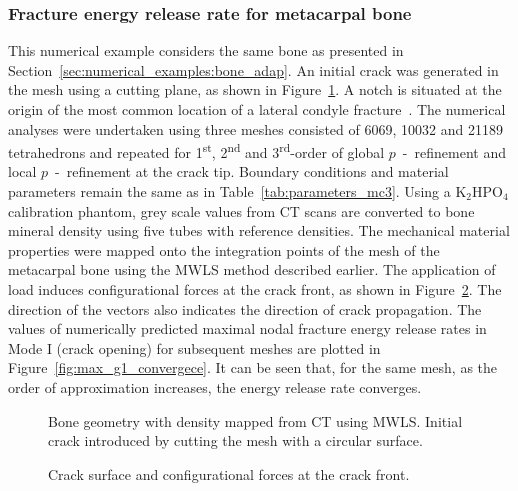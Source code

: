 \documentclass[twocolumn]{svjour3}
\begin{document}
\subsubsection{Fracture energy release rate for metacarpal bone} 
\label{sec:mc3_release_eng}
This numerical example considers the same bone as presented in Section~\ref{sec:numerical_examples:bone_adap}. 
An initial crack was generated in the mesh using a cutting plane, as shown in Figure~\ref{fig:bone_ct_mesh_cut}. A notch is situated at the origin of the most common location of a lateral condyle fracture~\cite{jacklin2012frequency}. 
The numerical analyses were undertaken using three meshes consisted of 6069, 10032 and 21189 tetrahedrons and repeated for 1\textsuperscript{st}, 2\textsuperscript{nd} and 3\textsuperscript{rd}-order of global $p$~-~refinement and local $p$~-~refinement at the crack tip. 
Boundary conditions and material parameters remain the same as in Table~\ref{tab:parameters_mc3}. 
Using a $\mathrm {K_2 HPO_4}$ calibration phantom, grey scale values from CT scans are converted to bone mineral density using five tubes with reference densities. 
The mechanical material properties were mapped onto the integration points of the mesh of the metacarpal bone using the MWLS method described earlier. 
The application of load induces configurational forces at the crack front, as shown in Figure~\ref{fig:crackfrontforce}. 
The direction of the vectors also indicates the direction of crack propagation.
The values of numerically predicted maximal nodal fracture energy release rates in Mode I (crack opening) for subsequent meshes are plotted in Figure~\ref{fig:max_g1_convergece}. 
It can be seen that, for the same mesh, as the order of approximation increases, the energy release rate converges. 
\begin{figure}[h]
	\centering
		\def\svgwidth{7cm}
		
	\caption{Bone geometry with density mapped from CT using MWLS. Initial crack introduced by cutting the mesh with a circular surface.}
	\label{fig:bone_ct_mesh_cut}
\end{figure}

\begin{figure}[h!]
	\centering
	\def\svgwidth{7cm}
	
	\caption{Crack surface and configurational forces at the crack front.}
	\label{fig:crackfrontforce}
\end{figure}
\end{document}
